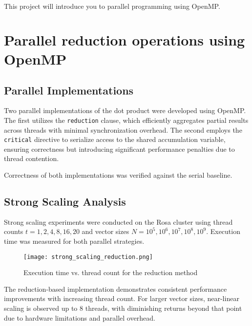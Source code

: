 \documentclass[unicode,11pt,a4paper,oneside,numbers=endperiod,openany]{scrartcl}
\begin{document}
\setassignment

\newline

\assignmentpolicy
This project will introduce you to parallel programming using OpenMP. 

\section{Parallel reduction operations using OpenMP }

\subsection*{Parallel Implementations}

Two parallel implementations of the dot product were developed using OpenMP. The first utilizes the \texttt{reduction} clause, which efficiently aggregates partial results across threads with minimal synchronization overhead. The second employs the \texttt{critical} directive to serialize access to the shared accumulation variable, ensuring correctness but introducing significant performance penalties due to thread contention.

Correctness of both implementations was verified against the serial baseline.

\subsection*{Strong Scaling Analysis}

Strong scaling experiments were conducted on the Rosa cluster using thread counts $t = 1, 2, 4, 8, 16, 20$ and vector sizes $N = 10^5, 10^6, 10^7, 10^8, 10^9$. Execution time was measured for both parallel strategies.

\begin{figure}[h]
  \centering
  \texttt{[image: strong\_scaling\_reduction.png]}
  \caption{Execution time vs. thread count for the reduction method}
\end{figure}

The reduction-based implementation demonstrates consistent performance improvements with increasing thread count. For larger vector sizes, near-linear scaling is observed up to 8 threads, with diminishing returns beyond that point due to hardware limitations and parallel overhead.
\end{document}

